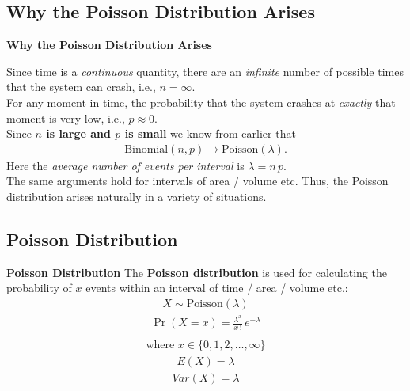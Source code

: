\documentclass[compress]{beamer}        %
\makeatletter
\newcommand{\tcb}{\textcolor{beamer@blendedblue}}
\makeatother
\begin{document}
\subsection{Why the Poisson Distribution Arises}
\begin{frame}{\bf \tcb{Why the Poisson Distribution Arises}}

Since time is a \emph{continuous} quantity, there are an \emph{infinite} number of possible times that the system can crash, i.e., $n = \infty$.\\[0.6cm]
For any moment in time, the probability that the system crashes at \emph{exactly} that moment is very low, i.e., $p \approx 0$.\\[0.6cm]

Since {\bf{\boldmath$n$} is large and {\boldmath$p$} is small} we know from earlier that
\begin{align*}
\text{Binomial}(n,p) \rightarrow \text{Poisson}(\lambda).
\end{align*}
Here the \emph{average number of events per interval} is $\lambda = n\,p$.\\[0.6cm]

The same arguments hold for intervals of area / volume etc. Thus, the Poisson distribution arises naturally in a variety of situations.
\end{frame}

\subsection{Poisson Distribution}
\begin{frame}{\bf \tcb{Poisson Distribution}}
The {\bf Poisson distribution} is used for calculating the probability of $x$ events within an interval of time / area / volume etc.:
\begin{align*}
\boxed{X \sim \text{Poisson}(\lambda)}
\end{align*}
\begin{align*}
\boxed{\Pr(X = x) = \frac{\lambda^x}{x\,!}\,e^{-\lambda}}\\[-1cm]
\end{align*}
\begin{align*}
\text{where } \boxed{x \in \{0,1,2,\ldots,\infty\}}
\end{align*}
\begin{align*}
\boxed{E(X) = \lambda}
\end{align*}
\begin{align*}
\boxed{Var(X) = \lambda}\\[-0.5cm]
\end{align*}

\end{frame}
\end{document}
